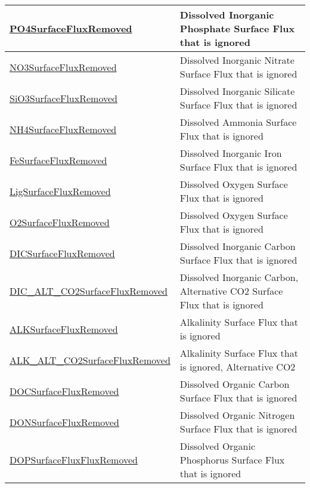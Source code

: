 {\begin{center}
\begin{longtable}{| p{2.0in} | p{4.0in} |}
    \hline
    \hyperref[subsec:var_sec_forcing_PO4SurfaceFluxRemoved]{PO4SurfaceFluxRemoved} & Dissolved Inorganic Phosphate Surface Flux that is ignored \\
    \hline
    \hyperref[subsec:var_sec_forcing_NO3SurfaceFluxRemoved]{NO3SurfaceFluxRemoved} & Dissolved Inorganic Nitrate Surface Flux that is ignored \\
    \hline
    \hyperref[subsec:var_sec_forcing_SiO3SurfaceFluxRemoved]{SiO3SurfaceFluxRemoved} & Dissolved Inorganic Silicate Surface Flux that is ignored \\
    \hline
    \hyperref[subsec:var_sec_forcing_NH4SurfaceFluxRemoved]{NH4SurfaceFluxRemoved} & Dissolved Ammonia Surface Flux that is ignored \\
    \hline
    \hyperref[subsec:var_sec_forcing_FeSurfaceFluxRemoved]{FeSurfaceFluxRemoved} & Dissolved Inorganic Iron Surface Flux that is ignored \\
    \hline
    \hyperref[subsec:var_sec_forcing_LigSurfaceFluxRemoved]{LigSurfaceFluxRemoved} & Dissolved Oxygen Surface Flux that is ignored \\
    \hline
    \hyperref[subsec:var_sec_forcing_O2SurfaceFluxRemoved]{O2SurfaceFluxRemoved} & Dissolved Oxygen Surface Flux that is ignored \\
    \hline
    \hyperref[subsec:var_sec_forcing_DICSurfaceFluxRemoved]{DICSurfaceFluxRemoved} & Dissolved Inorganic Carbon Surface Flux that is ignored \\
    \hline
    \hyperref[subsec:var_sec_forcing_DIC_ALT_CO2SurfaceFluxRemoved]{DIC\_ALT\_CO2SurfaceFlux\-Removed} & Dissolved Inorganic Carbon, Alternative CO2 Surface Flux that is ignored \\
    \hline
    \hyperref[subsec:var_sec_forcing_ALKSurfaceFluxRemoved]{ALKSurfaceFluxRemoved} & Alkalinity Surface Flux that is ignored \\
    \hline
    \hyperref[subsec:var_sec_forcing_ALK_ALT_CO2SurfaceFluxRemoved]{ALK\_ALT\_CO2SurfaceFlux\-Removed} & Alkalinity Surface Flux that is ignored, Alternative CO2 \\
    \hline
    \hyperref[subsec:var_sec_forcing_DOCSurfaceFluxRemoved]{DOCSurfaceFluxRemoved} & Dissolved Organic Carbon Surface Flux that is ignored \\
    \hline
    \hyperref[subsec:var_sec_forcing_DONSurfaceFluxRemoved]{DONSurfaceFluxRemoved} & Dissolved Organic Nitrogen Surface Flux that is ignored \\
    \hline
    \hyperref[subsec:var_sec_forcing_DOPSurfaceFluxFluxRemoved]{DOPSurfaceFluxFluxRemoved} & Dissolved Organic Phosphorus Surface Flux that is ignored \\

\end{longtable}
\end{center}}
